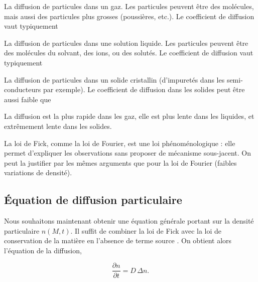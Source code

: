 \documentclass[12pt,fancy]{cours}
\begin{document}
\begin{liste}
\item La diffusion de particules dans un gaz. Les particules peuvent être des molécules, mais aussi des particules plus grosses (poussières, etc.). Le coefficient de diffusion vaut typiquement 
\item La diffusion de particules dans une solution liquide. Les particules peuvent être des molécules du solvant, des ions, ou des solutés. Le coefficient de diffusion vaut typiquement 
\item La diffusion de particules dans un solide cristallin (d’impuretés dans les semi-conducteurs par exemple). Le coefficient de diffusion dans les solides peut être aussi faible que 
\end{liste}

  La diffusion est la plus rapide dans les gaz, elle est plus lente dans les liquides, et extrêmement lente dans les solides.

La loi de Fick, comme la loi de Fourier, est une loi phénoménologique : elle permet d’expliquer les observations sans proposer de mécanisme sous-jacent. On peut la justifier par les mêmes arguments que pour la loi de Fourier (faibles variations de densité).


\subsection{Équation de diffusion particulaire}
\label{sec:equadiff}
Nous souhaitons maintenant obtenir une équation générale portant sur la densité particulaire $n(M,t)$. Il suffit de
combiner la loi de Fick  avec la loi de conservation de la matière en l’absence de terme
source . On obtient alors l’équation de la diffusion,
\begin{theorem}\label{form:eqdiff}
\begin{equation*}
\dfrac{\partial n}{\partial t}=D\,\Delta n.
\end{equation*}
\end{theorem}
\end{document}
